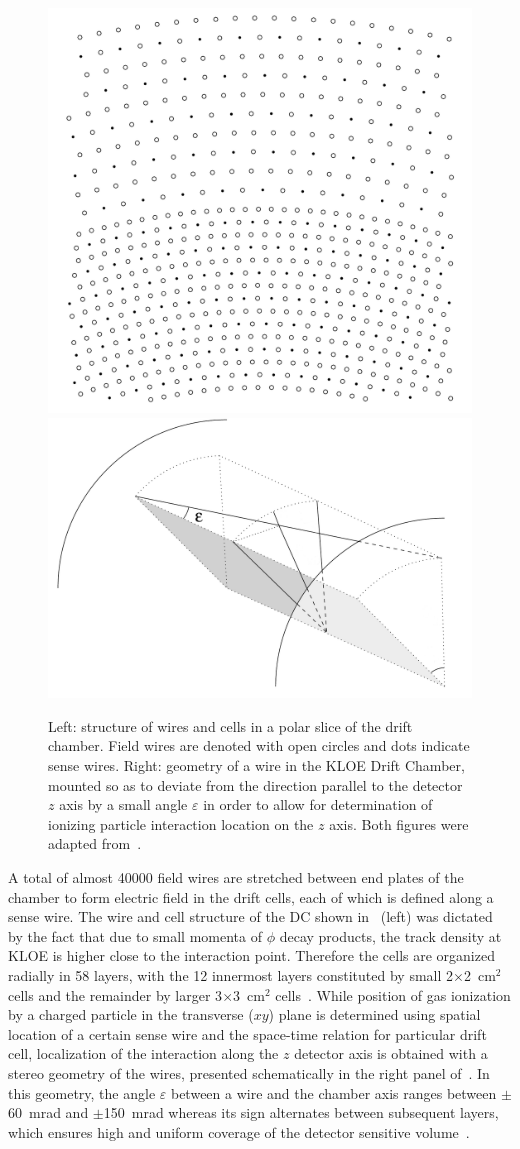 \begin{figure}[h!]
  \centering
  \includegraphics[height=31ex]{Chapter3_detectors/img/dc_cells}
  \hspace{1em}
  \includegraphics[height=31ex]{Chapter3_detectors/img/stereoangle1}
  \caption{Left: structure of wires and cells in a polar slice of the drift chamber. Field wires are denoted with open circles and dots indicate sense wires. Right: geometry of a wire in the KLOE Drift Chamber, mounted so as to deviate from the direction parallel to the detector $z$ axis by a small angle $\varepsilon$ in order to allow for determination of ionizing particle interaction location on the $z$ axis. Both figures were adapted from~\cite{Adinolfi:2002uk}.\label{fig:dc}}
\end{figure}

A total of almost 40000 field wires are stretched between end plates of the chamber to form electric field in the drift cells, each of which is defined  along a sense wire. The wire and cell structure of the DC shown in~ (left) was dictated by the fact that due to small momenta of $\phi$ decay products, the track density at KLOE is higher close to the interaction point. Therefore the cells are organized radially in 58 layers, with the 12 innermost layers constituted by small 2$\times$2~cm$^2$ cells and the remainder by larger 3$\times$3~cm$^2$ cells~\cite{Adinolfi:2002uk}.
While position of gas ionization by a charged particle in the transverse ($xy$) plane is determined using spatial location of a certain sense wire and the space-time relation for particular drift cell, localization of the interaction along the $z$ detector axis is obtained with a stereo geometry of the wires, presented schematically in the right panel of~. In this geometry, the angle $\varepsilon$ between a wire and the chamber axis ranges between $\pm$60~mrad and $\pm$150~mrad whereas its sign alternates between subsequent layers, which ensures high and uniform coverage of the detector sensitive volume~\cite{Adinolfi:2002uk}.

